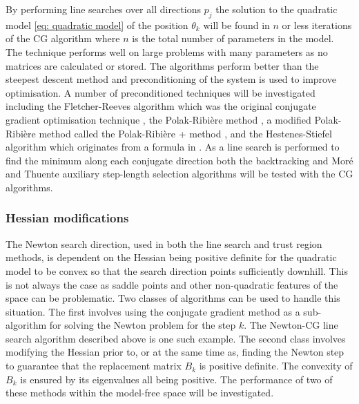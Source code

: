 \begin{htmlonly}
\begin{htmlonly}
\noindent By performing line searches over all directions $p_j$ the solution to the quadratic model \eqref{eq: quadratic model} of the position $\theta_k$ will be found in $n$ or less iterations of the CG algorithm where $n$ is the total number of parameters in the model.  The technique performs well on large problems with many parameters as no matrices are calculated or stored.  The algorithms perform better than the steepest descent method and preconditioning of the system is used to improve optimisation.  A number of preconditioned techniques will be investigated including the Fletcher-Reeves algorithm which was the original conjugate gradient optimisation technique \citep{FletcherReeves64}, the Polak-Ribi\`ere method \citep{PolakRibiere69}, a modified Polak-Ribi\`ere method called the Polak-Ribi\`ere + method \citep{NocedalWright99}, and the Hestenes-Stiefel algorithm which originates from a formula in \citet{HestenesStiefel52}.  As a line search is performed to find the minimum along each conjugate direction both the backtracking and Mor\'e and Thuente auxiliary step-length selection algorithms will be tested with the CG algorithms.



\subsubsection{Hessian modifications}

The Newton search direction, used in both the line search and trust region methods, is dependent on the Hessian being positive definite for the quadratic model to be convex so that the search direction points sufficiently downhill.  This is not always the case as saddle points and other non-quadratic features of the space can be problematic.  Two classes of algorithms can be used to handle this situation.  The first involves using the conjugate gradient method as a sub-algorithm for solving the Newton problem for the step $k$.  The Newton-CG line search algorithm described above is one such example.  The second class involves modifying the Hessian prior to, or at the same time as, finding the Newton step to guarantee that the replacement matrix $B_k$ is positive definite.  The convexity of $B_k$ is ensured by its eigenvalues all being positive.  The performance of two of these methods within the model-free space will be investigated.


\end{htmlonly}
\end{htmlonly}
